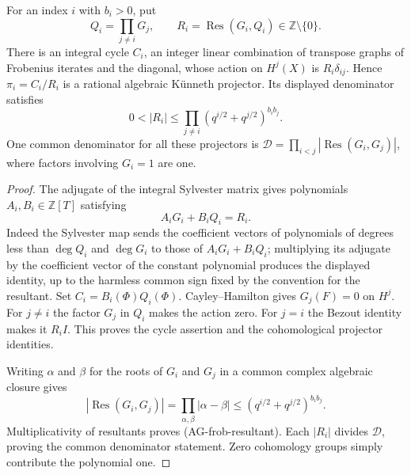 \begin{proposition}
For an index $i$ with $b_i>0$, put
\[
 Q_i=\prod_{j\ne i}G_j,\qquad
 R_i=\operatorname{Res}(G_i,Q_i)\in\mathbb Z\setminus\{0\}.
\]
There is an integral cycle $C_i$, an integer linear
combination of transpose graphs of Frobenius iterates and the diagonal,
whose action on $H^j(X)$ is $R_i\delta_{ij}$.
Hence $\pi_i=C_i/R_i$ is a rational algebraic K\"unneth
projector.  Its displayed denominator satisfies
\[
 0<|R_i|\le
 \prod_{j\ne i}
       (q^{i/2}+q^{j/2})^{b_i b_j}.
\tag{AG-frob-resultant}
\]
One common denominator for all these projectors is
$\mathcal D=\prod_{i<j}|\operatorname{Res}(G_i,G_j)|$,
where factors involving $G_i=1$ are one.
\end{proposition}
\begin{proof}
The adjugate of the integral Sylvester matrix gives polynomials
$A_i,B_i\in\mathbb Z[T]$ satisfying
\[
                  A_iG_i+B_iQ_i=R_i.
\]
Indeed the Sylvester map sends the coefficient vectors of
polynomials of degrees less than $\deg Q_i$ and $\deg G_i$
to those of $A_iG_i+B_iQ_i$; multiplying its adjugate by
the coefficient vector of the constant polynomial produces
the displayed identity, up to the harmless common sign
fixed by the convention for the resultant.
Set $C_i=B_i(\Phi)Q_i(\Phi)$.  Cayley--Hamilton gives
$G_j(F)=0$ on $H^j$.  For $j\ne i$ the factor $G_j$
in $Q_i$ makes the action zero.  For $j=i$ the Bezout
identity makes it $R_iI$.  This proves the cycle assertion
and the cohomological projector identities.

Writing $\alpha$ and $\beta$ for the roots of $G_i$ and
$G_j$ in a common complex algebraic closure gives
\[
 |\operatorname{Res}(G_i,G_j)|
   =\prod_{\alpha,\beta}|\alpha-\beta|
   \le(q^{i/2}+q^{j/2})^{b_i b_j}.
\]
Multiplicativity of resultants proves (AG-frob-resultant).
Each $|R_i|$ divides $\mathcal D$, proving the common
denominator statement.  Zero cohomology groups simply
contribute the polynomial one.
\end{proof}

